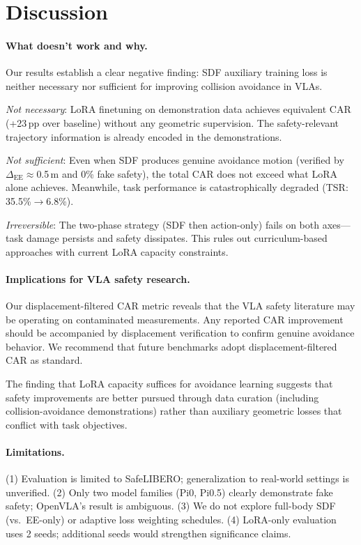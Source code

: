 \documentclass[letterpaper]{article}
\begin{document}
\section{Discussion}
\label{sec:discussion}

\paragraph{What doesn't work and why.}
Our results establish a clear negative finding: SDF auxiliary training loss is neither necessary nor sufficient for improving collision avoidance in VLAs.

\emph{Not necessary}: LoRA finetuning on demonstration data achieves equivalent CAR (+23\,pp over baseline) without any geometric supervision. The safety-relevant trajectory information is already encoded in the demonstrations.

\emph{Not sufficient}: Even when SDF produces genuine avoidance motion (verified by $\Delta_{\text{EE}}\approx$0.5\,m and 0\% fake safety), the total CAR does not exceed what LoRA alone achieves. Meanwhile, task performance is catastrophically degraded (TSR: 35.5\%$\to$6.8\%).

\emph{Irreversible}: The two-phase strategy (SDF then action-only) fails on both axes---task damage persists and safety dissipates. This rules out curriculum-based approaches with current LoRA capacity constraints.

\paragraph{Implications for VLA safety research.}
Our displacement-filtered CAR metric reveals that the VLA safety literature may be operating on contaminated measurements. Any reported CAR improvement should be accompanied by displacement verification to confirm genuine avoidance behavior. We recommend that future benchmarks adopt displacement-filtered CAR as standard.

The finding that LoRA capacity suffices for avoidance learning suggests that safety improvements are better pursued through data curation (including collision-avoidance demonstrations) rather than auxiliary geometric losses that conflict with task objectives.

\paragraph{Limitations.}
(1) Evaluation is limited to SafeLIBERO; generalization to real-world settings is unverified.
(2) Only two model families (Pi0, Pi0.5) clearly demonstrate fake safety; OpenVLA's result is ambiguous.
(3) We do not explore full-body SDF (vs.\ EE-only) or adaptive loss weighting schedules.
(4) LoRA-only evaluation uses 2 seeds; additional seeds would strengthen significance claims.
\end{document}
